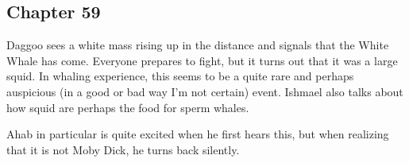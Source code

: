 \subsection{Chapter 59}

Daggoo sees a white mass rising up in the distance and signals that the White
Whale has come. Everyone prepares to fight, but it turns out that it was a
large squid. In whaling experience, this seems to be a quite rare and perhaps
auspicious (in a good or bad way I'm not certain) event. Ishmael also talks about how squid are perhaps the food for sperm whales.

Ahab in particular is quite excited when he first hears this, but when
realizing that it is not Moby Dick, he turns back silently.

